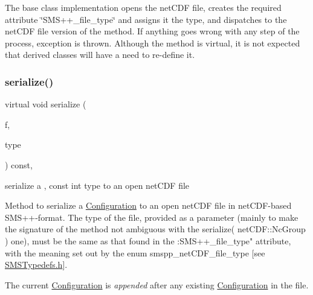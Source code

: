 The base class implementation opens the net\+C\+DF file, creates the required attribute \char`\"{}\+S\+M\+S++\+\_\+file\+\_\+type\char`\"{} and assigns it the type, and dispatches to the net\+C\+DF file version of the method. If anything goes wrong with any step of the process, exception is thrown. Although the method is virtual, it is not expected that derived classes will have a need to re-\/define it. \mbox{\label{class_s_m_spp__di__unipi__it_1_1_configuration_a76975f9a636fcf85b4ed642b58422aaf}} 
\subsubsection{\texorpdfstring{serialize()}{serialize()}\hspace{0.1cm}{\footnotesize\ttfamily [2/3]}}
{\footnotesize\ttfamily virtual void serialize (\begin{DoxyParamCaption}\item[{net\+C\+D\+F\+::\+Nc\+File \&\&}]{f,  }\item[{const int}]{type }\end{DoxyParamCaption}) const\hspace{0.3cm}{\ttfamily [inline]}, {\ttfamily [virtual]}}



serialize a , const int type to an open net\+C\+DF file 

Method to serialize a \mbox{\hyperlink{class_s_m_spp__di__unipi__it_1_1_configuration}{Configuration}} to an open net\+C\+DF file in net\+C\+D\+F-\/based S\+M\+S++-\/format. The type of the file, provided as a parameter (mainly to make the signature of the method not ambiguous with the serialize( net\+C\+D\+F\+::\+Nc\+Group ) one), must be the same as that found in the \+:S\+M\+S++\+\_\+file\+\_\+type" attribute, with the meaning set out by the enum smspp\+\_\+net\+C\+D\+F\+\_\+file\+\_\+type \mbox{[}see \mbox{\hyperlink{_s_m_s_typedefs_8h}{S\+M\+S\+Typedefs.\+h}}\mbox{]}.

The current \mbox{\hyperlink{class_s_m_spp__di__unipi__it_1_1_configuration}{Configuration}} is {\itshape appended} after any existing \mbox{\hyperlink{class_s_m_spp__di__unipi__it_1_1_configuration}{Configuration}} in the file.

